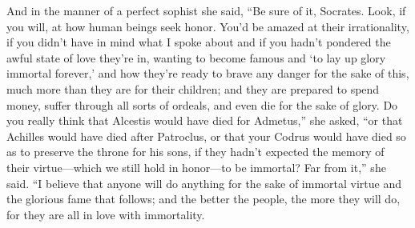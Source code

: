 And in the manner of a perfect sophist she said, “Be sure of it,
Socrates. Look, if you will, at how human beings seek honor. You'd be
amazed at their irrationality, if you didn't have in mind what I spoke
about and if you hadn't pondered the awful state of love they're in,
wanting to become famous and ‘to lay up glory immortal forever,' and how
they're ready to brave any danger for the sake of this, much more than
they are for their children; and they are prepared to spend money,
suffer through all sorts of ordeals, and even die for the sake of glory.
Do you really think that  Alcestis would have died for Admetus,”
she asked, “or that Achilles would have died after Patroclus, or that
your Codrus would have died so as to preserve the throne for his
sons, if they hadn't
expected the memory of their virtue---which we still hold in honor---to
be immortal? Far from it,” she said. “I believe that anyone will do
anything for the sake of immortal virtue and the glorious fame that
follows; and the better the people, the  more they will do, for
they are all in love with immortality.

